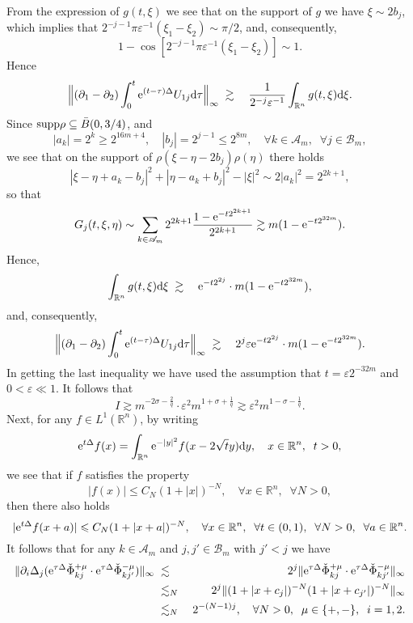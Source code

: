 \documentclass[11pt]{article}
\newcommand{\supp}{{\rm supp}}
\newcommand{\rmd}{\mbox{\rm d}}
\newcommand{\rme}{{\rm e}}
\begin{document}
  From the expression of $g(t,\xi)$ we see that on the support of $g$ we have $\xi\sim 2b_j$, which implies that
  $2^{-j-1}\pi\varepsilon^{-1}(\xi_1-\xi_2)\sim \pi/2$, and, consequently,
$$
  1-\cos[2^{-j-1}\pi\varepsilon^{-1}(\xi_1-\xi_2)]\sim 1.
$$
  Hence
\begin{eqnarray*}
  \Big\|(\partial_1-\partial_2)\int_0^t\rme^{(t-\tau)\Delta}U_{1j}\rmd\tau\Big\|_{\infty}
  &\;\gtrsim\;&\frac{1}{2^{-j}\varepsilon^{-1}}\int_{\mathbb{R}^n}g(t,\xi)\rmd\xi.
\end{eqnarray*}
  Since $\supp\rho\subseteq\bar{B}(0,3/4)$, and
$$
  |a_k|=2^k\geqslant 2^{16m+4}, \quad  |b_j|=2^{j-1}\leqslant 2^{8m}, \quad \forall k\in\mathscr{A}_m,\;\; \forall j\in\mathscr{B}_m,
$$
  we see that on the support of $\rho(\xi-\eta-2b_j)\rho(\eta)$ there holds
$$
  |\xi-\eta+a_k-b_j|^2+|\eta-a_k+b_j|^2-|\xi|^2\sim 2|a_k|^2=2^{2k+1},
$$
  so that
$$
  G_{j}(t,\xi,\eta)\sim\sum_{k\in\mathscr{A}_m}2^{2k+1}\frac{1-\rme^{-t2^{2k+1}}}{2^{2k+1}}\gtrsim m(1-\rme^{-t2^{32m}}).
$$
  Hence,
\begin{eqnarray*}
  \int_{\mathbb{R}^n}g(t,\xi)\rmd\xi &\;\gtrsim\;&\rme^{-t2^{2j}}\cdot m(1-\rme^{-t2^{32m}}),
\end{eqnarray*}
  and, consequently,
\begin{eqnarray*}
  \Big\|(\partial_1-\partial_2)\int_0^t\rme^{(t-\tau)\Delta}U_{1j}\rmd\tau\Big\|_{\infty}
  &\;\gtrsim\;&2^j\varepsilon\rme^{-t2^{2j}}\cdot m(1-\rme^{-t2^{32m}}).
\end{eqnarray*}
  In getting the last inequality we have used the assumption that $t=\varepsilon 2^{-32m}$ and $0<\varepsilon\ll 1$. It follows that
\begin{equation}
  I\gtrsim m^{-2\sigma-\frac{2}{q}}\cdot\varepsilon^2 m^{1+\sigma+\frac{1}{q}}\gtrsim\varepsilon^2 m^{1-\sigma-\frac{1}{q}}.
\end{equation}
  Next, for any $f\in L^1(\mathbb{R}^n)$, by writing
$$
  \rme^{t\Delta}f(x)=\int_{\mathbb{R}^n}\rme^{-|y|^2}f(x-2\sqrt{t}y)\rmd y, \quad x\in\mathbb{R}^n, \;\; t>0,
$$
  we see that if $f$ satisfies the property
$$
  |f(x)|\leqslant C_N(1+|x|)^{-N}, \quad \forall x\in\mathbb{R}^n, \;\; \forall N>0,
$$
  then there also holds
$$
  |\rme^{t\Delta}f(x+a)|\leqslant C_N(1+|x+a|)^{-N}, \quad \forall x\in\mathbb{R}^n, \;\; \forall t\in (0,1),
   \;\; \forall N>0, \;\; \forall a\in\mathbb{R}^n.
$$
  It follows that for any $k\in\mathscr{A}_m$ and $j,j'\in\mathscr{B}_m$ with $j'<j$ we have
\begin{eqnarray*}
  \|\partial_i\Delta_j(\rme^{\tau\Delta}\check{\Phi}_{kj}^{+\mu}\cdot\rme^{\tau\Delta}\check{\Phi}_{kj'}^{-\mu})\|_{\infty}
  &\;\lesssim\;& 2^j\|\rme^{\tau\Delta}\check{\Phi}_{kj}^{+\mu}\cdot\rme^{\tau\Delta}\check{\Phi}_{kj'}^{-\mu}\|_{\infty}
\nonumber\\
  &\;\lesssim_N\;& 2^j\|(1+|x+c_j|)^{-N}(1+|x+c_{j'}|)^{-N}\|_{\infty}
\nonumber\\
  &\;\lesssim_N\;& 2^{-(N-1)j}, \quad  \forall N>0, \;\; \mu\in\{+,-\}, \;\; i=1,2.
\end{eqnarray*}
\end{document}
